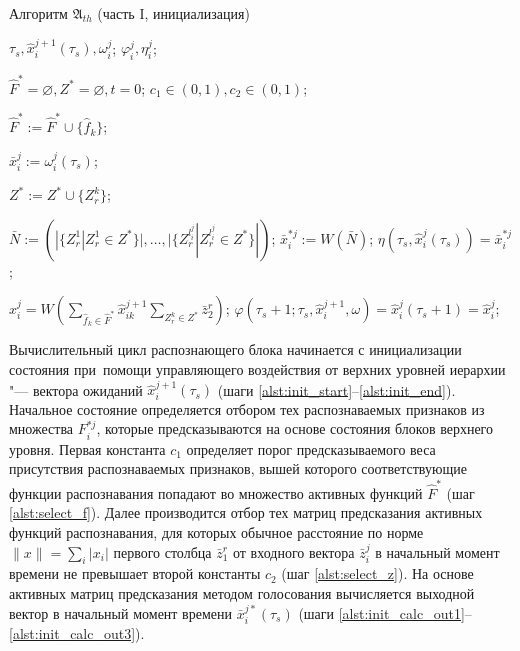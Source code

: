 \documentclass[a4paper, 12pt]{article}
\theoremstyle{plain}
\begin{document}
	\begin{algorithm}[H]
		\caption{Алгоритм $\mathfrak{A}_{th}$ (часть I, инициализация)}\label{alg:th_init}
		\begin{algorithmic}[1]
			\Require $\tau_s, \hat{x}_i^{j+1}(\tau_s), \omega_i^j$;
			\Ensure $\varphi_i^j, \eta_i^j$;
			
			\State $\hat{F}^*=\varnothing,Z^*=\varnothing,t=0$;
			\State $c_1\in(0,1), c_2\in(0,1)$;
			
			 \label{alst:init_start}
				 \label{alst:select_f}
					\State $\hat{F}^*:=\hat{F}^*\cup\{\hat{f}_k\}$;
				\EndIf
			\EndFor
			
			\State $\bar x_i^j:=\omega_i^j(\tau_s)$;
			
					 \label{alst:select_z}
						\State $Z^*:=Z^*\cup\{Z_r^k\}$;
					\EndIf
				\EndFor
			\EndFor
			
			\State $\bar N:=(|\{Z_r^1|Z_r^1\in Z^*\}|,\dots,|\{Z_r^{l_i^j}|Z_r^{l_i^j}\in Z^*\}|)$; \label{alst:init_calc_out1}
			\State $\bar{x}_i^{*j}:=W(\bar N)$; \label{init_alst:calc_out2}
			\State $\eta(\tau_s, \hat{x}_i^j(\tau_s))=\bar{x}_i^{*j}$; \label{alst:init_calc_out3}
			
			\State $\hat x_i^j=W(\sum_{\hat f_k\in\hat F^*}\hat x_{ik}^{j+1}\sum_{Z_r^k\in Z^*}\bar z_2^r)$; \label{alst:init_state}
			\State $\varphi(\tau_s+1;\tau_s,\hat{x}_i^{j+1}, \omega)=\hat{x}_i^j(\tau_s+1)=\hat{x}_i^j$;\label{alst:init_end}			
		\end{algorithmic}
	\end{algorithm}
	
	Вычислительный цикл распознающего блока начинается с инициализации состояния при~помощи управляющего воздействия от верхних уровней иерархии "--- вектора ожиданий $\hat x_i^{j+1}(\tau_s)$ (шаги \ref{alst:init_start}--\ref{alst:init_end}). Начальное состояние определяется отбором тех распознаваемых признаков из множества $F_i^{*j}$, которые предсказываются на основе состояния блоков верхнего уровня. Первая константа $c_1$ определяет порог предсказываемого веса присутствия распознаваемых признаков, вышей которого соответствующие функции распознавания попадают во множество активных функций $\hat F^*$ (шаг \ref{alst:select_f}). Далее производится отбор тех матриц предсказания активных функций распознавания, для которых обычное расстояние по норме $\|x\|=\sum_i |x_i|$ первого столбца $\bar z_1^r$ от входного вектора $\bar z_i^j$ в начальный момент времени не превышает второй константы $c_2$ (шаг \ref{alst:select_z}). На основе активных матриц предсказания методом голосования вычисляется выходной вектор в начальный момент времени $\bar x_i^{j*}(\tau_s)$ (шаги \ref{alst:init_calc_out1}--\ref{alst:init_calc_out3}).
		
\end{document}
